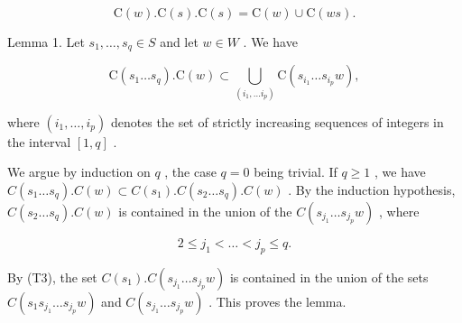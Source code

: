 \[
\mathrm{C} (w). \mathrm{C} (s). \mathrm{C} (s) = \mathrm{C} (w) \cup \mathrm{C} (w s).\tag{(5')}
\]

Lemma 1. Let \(s_1, \ldots, s_q \in S\) and let \(w \in W\) . We have

\[
\mathrm{C} \left(s _ {1} \dots s _ {q}\right). \mathrm{C} (w) \subset \bigcup_ {\left(i _ {1}, \dots i _ {p}\right)} \mathrm{C} \left(s _ {i _ {1}} \dots s _ {i _ {p}} w\right),
\]

where \((i_1, \ldots, i_p)\) denotes the set of strictly increasing sequences of integers in the interval \([1, q]\) .

We argue by induction on \(q\) , the case \(q = 0\) being trivial. If \(q \geqslant 1\) , we have \(C(s_1 \ldots s_q).C(w) \subset C(s_1).C(s_2 \ldots s_q).C(w)\) . By the induction hypothesis, \(C(s_2 \ldots s_q).C(w)\) is contained in the union of the \(C(s_{j_1} \ldots s_{j_p}w)\) , where

\[
2 \leqslant j _ {1} <   \dots <   j _ {p} \leqslant q.
\]

By (T3), the set \(C(s_{1}).C(s_{j_{1}}\ldots s_{j_{p}}w)\) is contained in the union of the sets \(C(s_{1}s_{j_{1}}\ldots s_{j_{p}}w)\) and \(C(s_{j_{1}}\ldots s_{j_{p}}w)\) . This proves the lemma.

